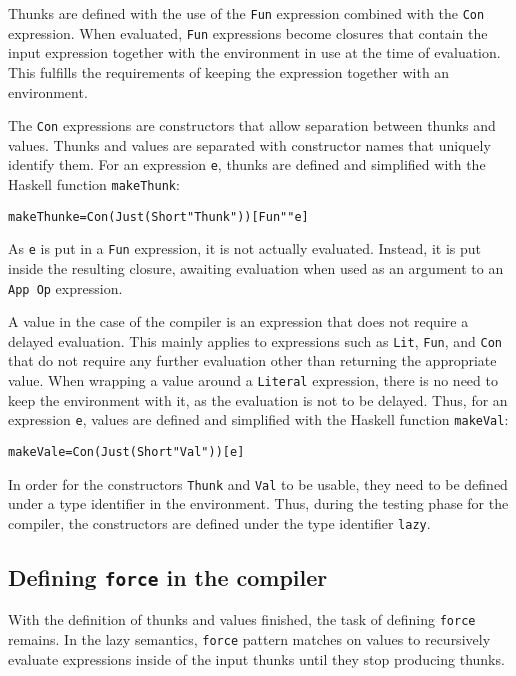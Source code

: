 Thunks are defined with the use of the \texttt{Fun} expression combined
with the \texttt{Con} expression. When evaluated, \texttt{Fun} expressions
become closures that contain the input expression together with the environment
in use at the time of evaluation. This fulfills the requirements of keeping
the expression together with an environment.

The \texttt{Con} expressions are constructors that allow separation between thunks
and values. Thunks and values are separated with constructor names that
uniquely identify them. For an expression \texttt{e}, thunks are defined and
simplified with the Haskell function \texttt{makeThunk}:

\begin{alltt}
  makeThunk e = Con (Just (Short "Thunk")) [Fun "" e]
\end{alltt}

\noindent As \texttt{e} is put in a \texttt{Fun} expression, it is not
actually evaluated. Instead, it is put inside the resulting closure, awaiting
evaluation when used as an argument to an \texttt{App Op} expression.

A value in the case of the compiler is an expression that does not require
a delayed evaluation. This mainly applies to expressions such as \texttt{Lit},
\texttt{Fun}, and \texttt{Con} that do not require any further evaluation other
than returning the appropriate value. When wrapping
a value around a \texttt{Literal} expression, there
is no need to keep the environment with it, as the evaluation is not to be
delayed. Thus, for an expression \texttt{e}, values are defined and simplified
with the Haskell function \texttt{makeVal}:

\begin{alltt}
  makeVal e = Con (Just (Short "Val")) [e]
\end{alltt}

In order for the constructors \texttt{Thunk} and \texttt{Val} to be usable,
they need to be defined under a type identifier in the environment. Thus,
during the testing phase for the compiler, the constructors are defined under
the type identifier \texttt{lazy}.

\subsection{Defining \texttt{force} in the compiler}
With the definition of thunks and values finished, the task of defining
\texttt{force} remains. In the lazy semantics, \texttt{force} pattern
matches on values to recursively evaluate expressions inside of the input thunks
until they stop producing thunks.

